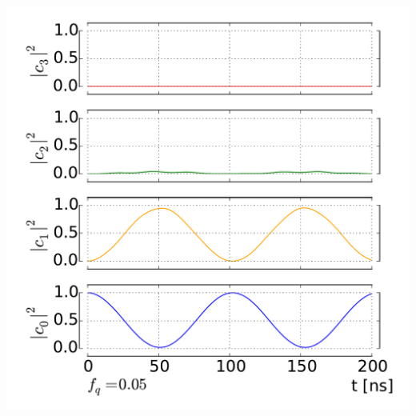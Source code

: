 \documentclass[aspectratio=169, 13pt]{beamer}
\begin{document}
{\begin{columns}[c]
\includegraphics[width=\textwidth]{tr_int_dr}
\end{columns}
}
\end{document}
